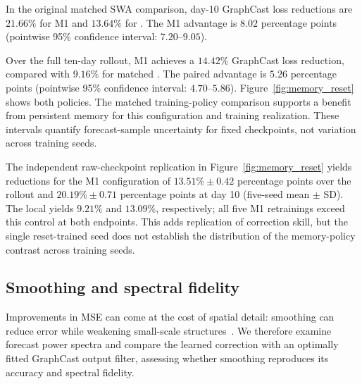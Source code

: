 \documentclass{article}
\newcommand{\vfourchange}[1]{{\color{blue}#1}}
\newcommand{\vfourred}[1]{{\color{red}#1}}
\newif\ifvfivechanges
\newcommand{\vfiveidentity}[1]{#1}
\DeclareRobustCommand{\vfiveadded}[1]{\ifvfivechanges{\color{vfiveAdded}%
  \let\vfourchange\vfiveidentity\let\vfourred\vfiveidentity#1}\else{\color{blue}%
  \let\vfourchange\vfiveidentity\let\vfourred\vfiveidentity#1}\fi}
\DeclareRobustCommand{\vfiveRone}[1]{\ifvfivechanges{\color{vfiveDeleted}\sout{#1}}\,\fi\vfiveadded{R1}}
\DeclareRobustCommand{\vfivewordchange}[2]{\ifvfivechanges{\color{vfiveDeleted}\sout{#1}}\,\fi\vfiveadded{#2}}
\begin{document}
\vfourchange{In the original matched SWA comparison, day-10 GraphCast loss reductions are $21.66\%$ for M1 and $13.64\%$ for \vfiveRone{reset/reset}. The M1 advantage is $8.02$ percentage points (pointwise 95\% confidence interval: $7.20$--$9.05$).}

\vfourchange{Over the full ten-day rollout, M1 achieves a $14.42\%$ GraphCast loss reduction, compared with $9.16\%$ for matched \vfiveRone{reset/reset}. The paired advantage is $5.26$ percentage points (pointwise 95\% confidence interval: $4.70$--$5.86$). Figure~\ref{fig:memory_reset} shows both policies. The matched training-policy comparison supports a benefit from persistent memory for this configuration and training realization. These intervals quantify forecast-sample uncertainty for fixed checkpoints, not variation across training seeds.}

\vfourchange{The independent raw-checkpoint replication in Figure~\ref{fig:memory_reset} yields reductions for the M1 configuration of $13.51\%\pm0.42$ percentage points over the rollout and $20.19\%\pm0.71$ percentage points at day 10 (five-seed mean $\pm$ SD). The local \vfiveRone{reset/reset} \vfivewordchange{control}{retraining} yields $9.21\%$ and $13.09\%$, respectively; all five M1 retrainings exceed this control at both endpoints. This adds replication of correction skill, but the single reset-trained seed does not establish the distribution of the memory-policy contrast across training seeds.}

\FloatBarrier
\subsection{\vfourred{Smoothing and spectral fidelity}}
\label{sec:smoothing}


\ifvfivechanges
\par\begingroup\color{vfiveDeleted}\noindent
\sout{It is known \mbox{\citep{lam2023graphcast,subich2025spectral}} that improvements in MSE can come at the cost of spatial detail: smoothing can reduce error while weakening small-scale structures. In order to investigate these effects we also examine spatial power spectra of forecast by assessing whether predictions preserve variability across spatial scales.  In particular, we compare the learned correction with an optimally smoothing filter applying to the GraphCast baseline to assess whether similar accuracy gains can be obtained through output smoothing and how the two approaches differ in spectral fidelity.}
\par\endgroup
\fi
\vfiveadded{\vfourred{Improvements in MSE can come at the cost of spatial detail: smoothing can reduce error while weakening small-scale structures~\citep{lam2023graphcast,subich2025spectral}. We therefore examine forecast power spectra and compare the learned correction with an optimally fitted GraphCast output filter, assessing whether smoothing reproduces its accuracy and spectral fidelity.}}
\end{document}
